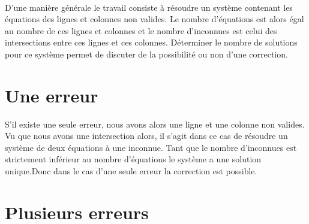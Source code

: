 \documentclass[a4paper, 10pt]{report}
\begin{document}
\paragraph*{}
D’une manière générale le travail consiste à résoudre un système contenant les équations des lignes et colonnes non valides. 
Le nombre d’équations est alors égal au nombre de ces lignes et colonnes et le nombre d’inconnues est celui des intersections 
entre ces lignes et ces colonnes.\newline
Déterminer le nombre de solutions pour ce système permet de discuter de la possibilité ou non d’une correction.

\section{Une erreur}
S’il existe une seule erreur, nous avons alors une ligne et une colonne non valides. Vu que nous avons une intersection 
alors, il s’agit dans ce cas de résoudre un système de deux équations à une inconnue.\newline
Tant que le nombre d’inconnues est strictement inférieur au nombre d’équations le système a une solution unique.Donc 
dans le cas d’une seule erreur la correction est possible.

\section{Plusieurs erreurs}
\end{document}
